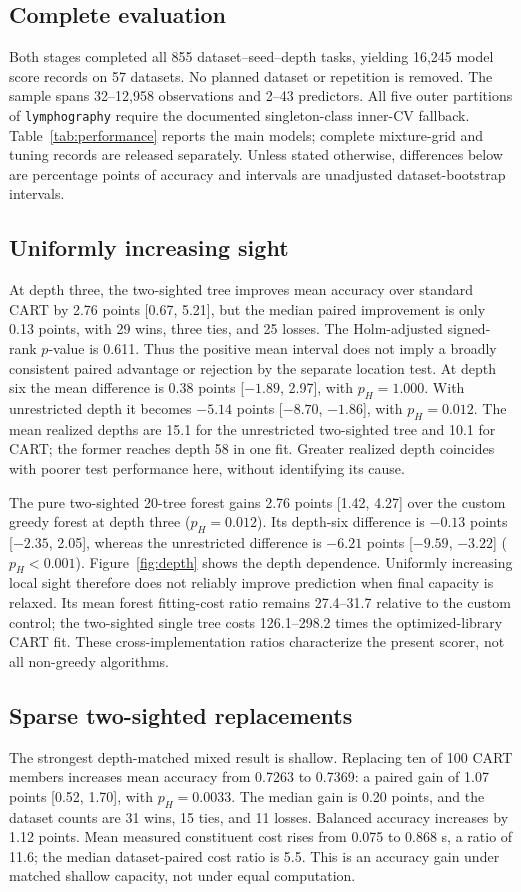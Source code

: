 \subsection{Complete evaluation}
Both stages completed all 855 dataset--seed--depth tasks, yielding 16,245 model score records on 57 datasets. No planned dataset or repetition is removed. The sample spans 32--12,958 observations and 2--43 predictors. All five outer partitions of \texttt{lymphography} require the documented singleton-class inner-CV fallback. Table~\ref{tab:performance} reports the main models; complete mixture-grid and tuning records are released separately. Unless stated otherwise, differences below are percentage points of accuracy and intervals are unadjusted dataset-bootstrap intervals.

\subsection{Uniformly increasing sight}
At depth three, the two-sighted tree improves mean accuracy over standard CART by 2.76 points [0.67, 5.21], but the median paired improvement is only 0.13 points, with 29 wins, three ties, and 25 losses. The Holm-adjusted signed-rank $p$-value is 0.611. Thus the positive mean interval does not imply a broadly consistent paired advantage or rejection by the separate location test. At depth six the mean difference is 0.38 points [$-1.89$, 2.97], with $p_H=1.000$. With unrestricted depth it becomes $-5.14$ points [$-8.70$, $-1.86$], with $p_H=0.012$. The mean realized depths are 15.1 for the unrestricted two-sighted tree and 10.1 for CART; the former reaches depth 58 in one fit. Greater realized depth coincides with poorer test performance here, without identifying its cause.

The pure two-sighted 20-tree forest gains 2.76 points [1.42, 4.27] over the custom greedy forest at depth three ($p_H=0.012$). Its depth-six difference is $-0.13$ points [$-2.35$, 2.05], whereas the unrestricted difference is $-6.21$ points [$-9.59$, $-3.22$] ($p_H<0.001$). Figure~\ref{fig:depth} shows the depth dependence. Uniformly increasing local sight therefore does not reliably improve prediction when final capacity is relaxed. Its mean forest fitting-cost ratio remains 27.4--31.7 relative to the custom control; the two-sighted single tree costs 126.1--298.2 times the optimized-library CART fit. These cross-implementation ratios characterize the present scorer, not all non-greedy algorithms.

\subsection{Sparse two-sighted replacements}
The strongest depth-matched mixed result is shallow. Replacing ten of 100 CART members increases mean accuracy from 0.7263 to 0.7369: a paired gain of 1.07 points [0.52, 1.70], with $p_H=0.0033$. The median gain is 0.20 points, and the dataset counts are 31 wins, 15 ties, and 11 losses. Balanced accuracy increases by 1.12 points. Mean measured constituent cost rises from 0.075 to 0.868 s, a ratio of 11.6; the median dataset-paired cost ratio is 5.5. This is an accuracy gain under matched shallow capacity, not under equal computation.

